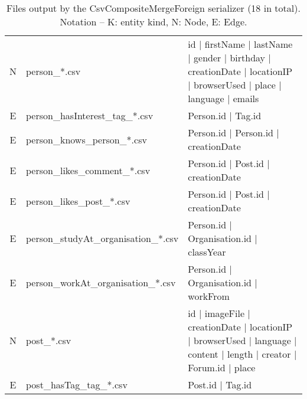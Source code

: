 \begin{table}[htb]
{\begin{tabular}{|c|p{4.3cm}|p{12.4cm}|}
        N                       & person\_*.csv                        & id | firstName | lastName | gender | birthday | creationDate | locationIP | browserUsed | place | language | emails \\
        E                       & person\_hasInterest\_tag\_*.csv      & Person.id | Tag.id                                                                                                  \\
        E                       & person\_knows\_person\_*.csv         & Person.id | Person.id | creationDate                                                                                \\
        E                       & person\_likes\_comment\_*.csv        & Person.id | Post.id | creationDate                                                                                  \\
        E                       & person\_likes\_post\_*.csv           & Person.id | Post.id | creationDate                                                                                  \\
        E                       & person\_studyAt\_organisation\_*.csv & Person.id | Organisation.id | classYear                                                                             \\
        E                       & person\_workAt\_organisation\_*.csv  & Person.id | Organisation.id | workFrom                                                                              \\
        \hline
        N                       & post\_*.csv                          & id | imageFile | creationDate | locationIP | browserUsed | language | content | length | creator | Forum.id | place \\
        E                       & post\_hasTag\_tag\_*.csv             & Post.id | Tag.id                                                                                                    \\
        \hline
    \end{tabular}}
    \caption{Files output by the CsvCompositeMergeForeign serializer (18 in total). Notation -- K: entity kind, N: Node, E: Edge.}
    \label{table:csv_composite_merge_foreign}
\end{table}
